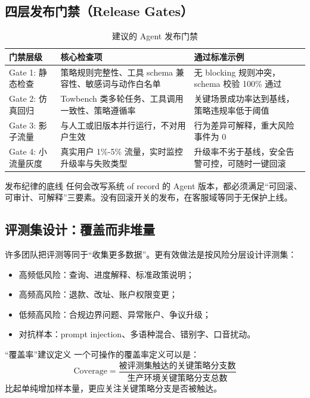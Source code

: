 \documentclass[a4paper]{article}
\begin{document}
\subsection{四层发布门禁（Release Gates）}

\begin{table}[H]
\centering
\caption{建议的 Agent 发布门禁}
\begin{tabularx}{\textwidth}{>{\raggedright\arraybackslash}p{2.2cm} >{\raggedright\arraybackslash}p{3.6cm} >{\raggedright\arraybackslash}X}
\toprule
门禁层级 & 核心检查项 & 通过标准示例 \\
\midrule
Gate 1: 静态检查 & 策略规则完整性、工具 schema 兼容性、敏感词与动作白名单 & 无 blocking 规则冲突，schema 校验 100\% 通过 \\
Gate 2: 仿真回归 & Towbench 类多轮任务、工具调用一致性、策略遵循率 & 关键场景成功率达到基线，策略违规率低于阈值 \\
Gate 3: 影子流量 & 与人工或旧版本并行运行，不对用户生效 & 行为差异可解释，重大风险事件为 0 \\
Gate 4: 小流量灰度 & 真实用户 1\%-5\% 流量，实时监控升级率与失败类型 & 升级率不劣于基线，安全告警可控，可随时一键回滚 \\
\bottomrule
\end{tabularx}
\end{table}

\begin{importantbox}{发布纪律的底线}
任何会改写系统 of record 的 Agent 版本，都必须满足“可回滚、可审计、可解释”三要素。没有回滚开关的发布，在客服域等同于无保护上线。
\end{importantbox}

\subsection{评测集设计：覆盖而非堆量}

许多团队把评测等同于“收集更多数据”。更有效做法是按风险分层设计评测集：
\begin{itemize}[leftmargin=1.5em]
    \item 高频低风险：查询、进度解释、标准政策说明；
    \item 高频高风险：退款、改址、账户权限变更；
    \item 低频高风险：合规边界问题、异常账户、争议升级；
    \item 对抗样本：prompt injection、多语种混合、错别字、口音扰动。
\end{itemize}

\begin{knowledgebox}{“覆盖率”建议定义}
一个可操作的覆盖率定义可以是：
\[
\text{Coverage} = \frac{\text{被评测集触达的关键策略分支数}}{\text{生产环境关键策略分支总数}}
\]
比起单纯增加样本量，更应关注关键策略分支是否被触达。
\end{knowledgebox}
\end{document}
